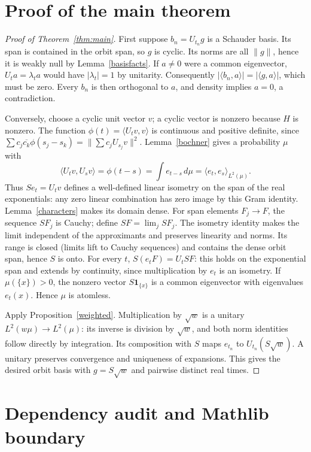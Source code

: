 \documentclass[reqno,a4paper,12pt]{amsart}
\newcommand{\ip}[2]{\langle #1,#2\rangle}
\begin{document}
\section{Proof of the main theorem}
\begin{proof}[Proof of Theorem~\ref{thm:main}]
First suppose $b_n=U_{t_n}g$ is a Schauder basis.
Its span is contained in the orbit span, so $g$ is cyclic.
Its norms are all $\|g\|$, hence it is weakly null by
Lemma~\ref{basisfacts}. If $a\ne0$ were a common eigenvector,
$U_ta=\lambda_ta$ would have $|\lambda_t|=1$ by unitarity.
Consequently $|\ip{b_n}{a}|=|\ip{g}{a}|$, which must be zero.
Every $b_n$ is then orthogonal to $a$, and density implies $a=0$,
a contradiction.

Conversely, choose a cyclic unit vector $v$; a cyclic vector is nonzero
because $H$ is nonzero. The function $\phi(t)=\ip{U_tv}{v}$ is
continuous and positive definite, since
$\sum c_j\overline{c_k}\phi(s_j-s_k)=\|\sum c_jU_{s_j}v\|^2$.
Lemma~\ref{bochner} gives a probability $\mu$ with
\[
 \ip{U_tv}{U_sv}=\phi(t-s)=\int e_{t-s}\,d\mu
 =\ip{e_t}{e_s}_{L^2(\mu)}.
\]
Thus $Se_t=U_tv$ defines a well-defined linear isometry on the span
of the real exponentials: any zero linear combination has zero image
by this Gram identity. Lemma~\ref{characters} makes its domain dense.
For span elements $F_j\to F$, the sequence $SF_j$ is Cauchy; define
$SF=\lim_jSF_j$. The isometry identity makes the limit independent of
the approximants and preserves linearity and norms.
Its range is closed (limits lift to Cauchy sequences) and contains the
dense orbit span, hence $S$ is onto. For every $t$,
$S(e_tF)=U_tSF$: this holds on the exponential span and extends by
continuity, since multiplication by $e_t$ is an isometry.
If $\mu(\{x\})>0$, the nonzero vector $S\mathbf1_{\{x\}}$ is a common
eigenvector with eigenvalues $e_t(x)$. Hence $\mu$ is atomless.

Apply Proposition~\ref{weighted}. Multiplication by $\sqrt w$ is a
unitary $L^2(w\mu)\to L^2(\mu)$: its inverse is division by
$\sqrt w$, and both norm identities follow directly by integration.
Its composition with $S$ maps $e_{t_n}$ to
$U_{t_n}(S\sqrt w)$. A unitary preserves convergence and uniqueness
of expansions. This gives the desired orbit basis with $g=S\sqrt w$
and pairwise distinct real times.
\end{proof}

\appendix
\section{Dependency audit and Mathlib boundary}\label{audit}
\end{document}
